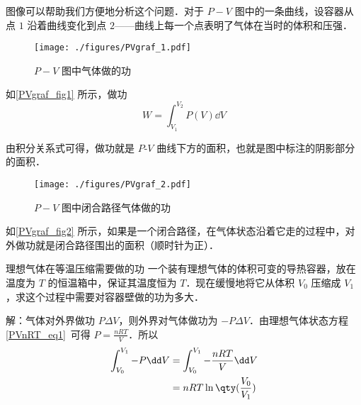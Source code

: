 图像可以帮助我们方便地分析这个问题．对于 $P-V$ 图中的一条曲线，设容器从点 $1$ 沿着曲线变化到点 $2$——曲线上每一个点表明了气体在当时的体积和压强．
\begin{figure}[ht]
\centering
\texttt{[image: ./figures/PVgraf\_1.pdf]}
\caption{$P-V$ 图中气体做的功} \label{PVgraf_fig1}
\end{figure}

如\autoref{PVgraf_fig1} 所示，做功
\begin{equation}\label{PVgraf_eq1}
W = \int_{V_1}^{V_2}P(V) \dd{V}
\end{equation}

由积分关系式可得，做功就是 $P$-$V$ 曲线下方的面积，也就是图中标注的阴影部分的面积． 

\begin{figure}[ht]  
\centering
\texttt{[image: ./figures/PVgraf\_2.pdf]}
\caption{$P-V$ 图中闭合路径气体做的功} \label{PVgraf_fig2}
\end{figure}

如\autoref{PVgraf_fig2} 所示，如果是一个闭合路径，在气体状态沿着它走的过程中，对外做功就是闭合路径围出的面积（顺时针为正）．

\begin{example}{理想气体在等温压缩需要做的功}
一个装有理想气体的体积可变的导热容器，放在温度为 $T$ 的恒温箱中，保证其温度恒为 $T$．现在缓慢地将它从体积 $V_0$ 压缩成 $V_1$，求这个过程中需要对容器壁做的功为多大．

解：气体对外界做功 $P\Delta V$，则外界对气体做功为 $-P\Delta V$．由理想气体状态方程\autoref{PVnRT_eq1}~可得 $P=\frac{nRT}{V}$．所以
\begin{equation}
\begin{aligned}
\int_{V_0}^{V_1} -P\dd V&=\int_{V_0}^{V_1} -\frac{nRT}{V} \dd V \\
&=nRT \ln\qty(\frac{V_0}{V_1})
\end{aligned}
\end{equation}
\end{example}
